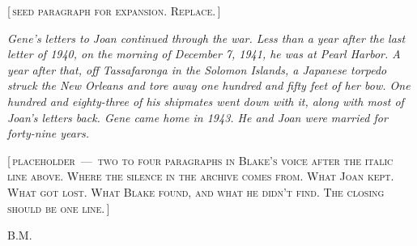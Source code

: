 %
%
%

\cleardoublepage
\thispagestyle{laempty}
\vspace*{0.10\textheight}
\begin{center}
    \par
    \vspace{0.6em}
    \brassrule[36pt]\par
\end{center}
\vspace{2em}

\noindent
%

\noindent
\textsc{[\,seed paragraph for expansion. Replace.\,]}
\vspace{0.4em}

\noindent
\itshape
Gene's letters to Joan continued through the war. Less than a year
after the last letter of 1940, on the morning of December 7, 1941,
he was at Pearl Harbor. A year after that, off Tassafaronga in the
Solomon Islands, a Japanese torpedo struck the New Orleans and tore
away one hundred and fifty feet of her bow. One hundred and eighty-three
of his shipmates went down with it, along with most of Joan's letters
back. Gene came home in 1943. He and Joan were married for forty-nine
years.
\upshape

\vspace{1.4em}
\brassornament

\vspace{1em}
\noindent
\textsc{[\,placeholder \,---\, two to four paragraphs in Blake's voice after the
italic line above. Where the silence in the archive comes from. What
Joan kept. What got lost. What Blake found, and what he didn't find.
The closing should be one line.\,]}
\vfill

\begin{flushright}
    {\handfont\Large B.M.}\par
\end{flushright}
